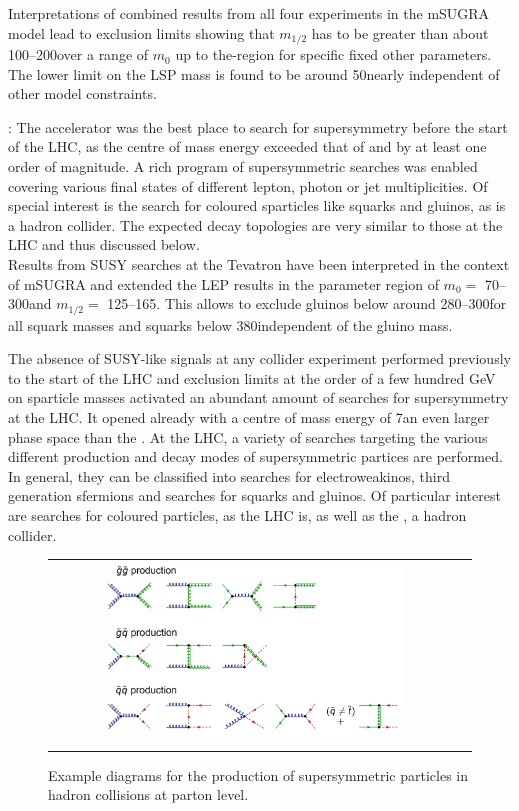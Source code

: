 \begin{description}
Interpretations of combined results from all four experiments in the mSUGRA model lead to exclusion limits showing that $m_{1/2}$ has to be greater than about 100--200\gev over a range of $m_{0}$ up to the\tev-region for specific fixed other parameters. The lower limit on the LSP mass is found to be around 50\gev nearly independent of other model constraints. 
 \item \textbf{\tevatron \cite{CDFLimits, D0Limits, Abazov200934}}: The \tevatron accelerator was the best place to search for supersymmetry before the start of the LHC, as the centre of mass energy exceeded that of \hera and \lep by at least one order of magnitude. A rich program of supersymmetric searches was enabled covering various final states of different lepton, photon or jet multiplicities. Of special interest is the search for coloured sparticles like squarks and gluinos, as \tevatron is a hadron collider. The expected decay topologies are very similar to those at the LHC and thus discussed below. \\
Results from SUSY searches at the Tevatron have been interpreted in the context of mSUGRA and extended the LEP results in the parameter region of $m_{0} =$ 70--300\gev and $m_{1/2} =$ 125--165\gev. This allows to exclude gluinos below around 280--300\gev for all squark masses and squarks below $380$\gev independent of the gluino mass. 
\end{description}
The absence of SUSY-like signals at any collider experiment performed previously to the start of the LHC and exclusion limits at the order of a few hundred GeV on sparticle masses activated an abundant amount of searches for supersymmetry at the LHC. It opened already with a centre of mass energy of 7\tev an even larger phase space than the \tevatron. At the LHC, a variety of searches targeting the various different production and decay modes of supersymmetric partices are performed. In general, they can be classified into searches for electroweakinos, third generation sfermions and searches for squarks and gluinos. Of particular interest are searches for coloured particles, as the LHC is, as well as the \tevatron, a hadron collider. 
\begin{figure}[!tp]
  \centering 
  \begin{tabular}{cc}
    \includegraphics[width=0.75\textwidth]{figures/Susy_Feynman.jpg} 
  \end{tabular}
  \caption{Example diagrams for the production of supersymmetric particles in hadron collisions at parton level.}
  \label{fig:susy_feynman}
\end{figure}
